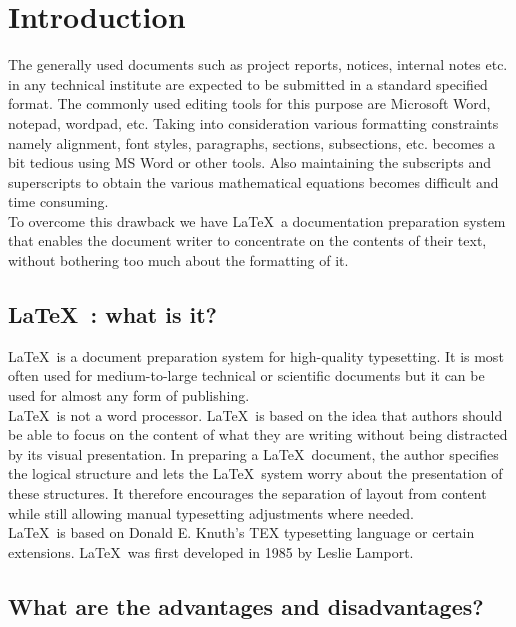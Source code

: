 \chapter{Introduction}

The generally used documents such as project reports, notices, internal notes etc. in any technical institute are expected to be submitted in a standard specified format. The commonly used editing tools for this purpose are Microsoft Word, notepad, wordpad, etc. Taking into consideration various formatting constraints namely alignment, font styles, paragraphs, sections, subsections, etc. becomes a bit tedious using MS Word or other tools. Also maintaining the subscripts and superscripts to obtain the various mathematical equations becomes difficult and time consuming. \\

To overcome this drawback we have \LaTeX \, a documentation preparation system that enables the document writer to concentrate on the contents of their text, without bothering too much about the formatting of it. 

\section{\LaTeX \ : what is it?}

\LaTeX \ is a document preparation system for high-quality typesetting. It is most often used for medium-to-large technical or scientific documents but it can be used for almost any form of publishing. \\

\LaTeX \ is not a word processor. \LaTeX \ is based on the idea that authors should be able to focus on the content of what they are writing without being distracted by its visual presentation. In preparing a \LaTeX \ document, the author specifies the logical structure and lets the \LaTeX \ system worry about the presentation of these structures. It therefore encourages the separation of layout from content while still allowing manual typesetting adjustments where needed. \\

\LaTeX \ is based on Donald E. Knuth’s TEX typesetting language or certain extensions. \LaTeX \ was first developed in 1985 by Leslie Lamport. 

\section{What are the advantages and disadvantages?}

